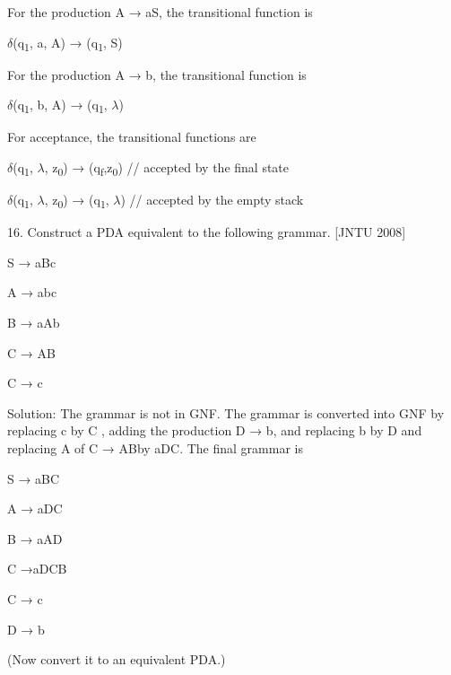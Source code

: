 \documentclass[]{article}
\begin{document}
For the production  A → aS, the transitional function is

\begin{center}
	$\delta$(q\textsubscript{1}, a, A) → (q\textsubscript{1}, S)
\end{center}

For the production  A → b, the transitional function is

\begin{center}
	$\delta$(q\textsubscript{1}, b, A) → (q\textsubscript{1}, $\lambda$)
\end{center}

For acceptance, the transitional functions are

\begin{center}
	$\delta$(q\textsubscript{1}, $\lambda$, z\textsubscript{0}) → (q\textsubscript{f},z\textsubscript{0}) // accepted by the final state
\end{center}
\begin{center}
	$\delta$(q\textsubscript{1}, $\lambda$, z\textsubscript{0}) → (q\textsubscript{1}, $\lambda$) // accepted by the empty stack
\end{center}



16. Construct a PDA equivalent to the following grammar. [JNTU 2008]

\begin{center}
	S → aBc
\end{center}
\begin{center}
	A → abc
\end{center}
\begin{center}
	B → aAb
\end{center}
\begin{center}
	C → AB
\end{center}
\begin{center}
	C → c
\end{center}


Solution: The grammar is not in GNF. The grammar is converted into GNF by replacing c by C , adding the production D → b, and replacing b by D and replacing A of C → ABby aDC. The final grammar is

\begin{center}
	S → aBC
\end{center}
\begin{center}
	A → aDC
\end{center}
\begin{center}
	B → aAD
\end{center}
\begin{center}
	C →aDCB
\end{center}
\begin{center}
	C → c
\end{center}
\begin{center}
	D → b
\end{center}
(Now convert it to an equivalent PDA.)
\end{document}

